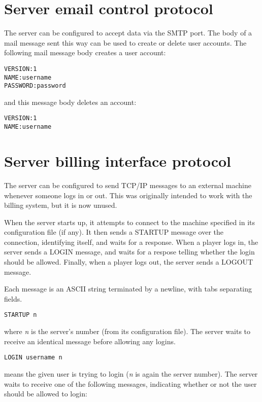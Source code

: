 \section{Server email control protocol}

The server can be configured to accept data via the SMTP port.  The
body of a mail message sent this way can be used to create or delete
user accounts.  The following mail message body creates a user account:

\begin{verbatim}
VERSION:1
NAME:username
PASSWORD:password
\end{verbatim}

and this message body deletes an account:

\begin{verbatim}
VERSION:1
NAME:username
\end{verbatim}

\section{Server billing interface protocol}

The server can be configured to send TCP/IP messages to an external
machine whenever someone logs in or out.  This was originally intended
to work with the billing system, but it is now unused.

When the server starts up, it attempts to connect to the machine
specified in its configuration file (if any).  It then sends a STARTUP
message over the connection, identifying itself, and waits for a
response.  When a player logs in, the server sends a LOGIN message,
and waits for a respose telling whether the login should be allowed.
Finally, when a player logs out, the server sends a LOGOUT message.

Each message is an ASCII string terminated by a newline, with tabs
separating fields.

\tline
\begin{verbatim}
STARTUP n
\end{verbatim}
where {\em n} is the server's number (from its configuration file).  The
server waits to receive an identical message before allowing any
logins.

\tline
\begin{verbatim}
LOGIN username n
\end{verbatim}
means the given user is trying to login ({\em n} is again the server
number).  The server waits to receive one of the following messages,
indicating whether or not the user should be allowed to login:

